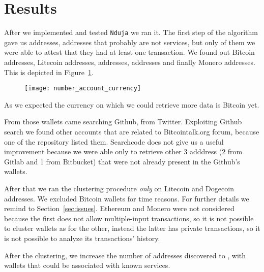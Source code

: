 \newcommand{\accountGitlab}{2}

\newcommand{\accountBitbucket}{1}





\section{Results} \label{results}
After we implemented and tested \texttt{Nduja} we ran it. The first step of the
algorithm gave us \startingNumberAllWallets{} addresses,
\startingNumberWalletsNotService{} addresses that probably are not services,
but only \startingNumberWalletsAtLeastOneTransaction{} of them we were able to
attest that they had at least one transaction. We found out \startingBTC{}
Bitcoin addresses, \startingLTC{} Litecoin addresses, \startingDOGE{}
addresses, \startingETH{} addresses and finally \startingXMR{} Monero
addresses. This is depicted in Figure~\ref{fig:numberaccountcurrency}.
\begin{figure}
\centering
\texttt{[image: number\_account\_currency]}
\label{fig:numberaccountcurrency}
\end{figure}

As we expected the currency on which we could retrieve more data is Bitcoin
yet. 

From those wallets \accountGithub{} came searching Github, \accountTwitter{}
from Twitter. Exploiting Github search we found other \accountBitcointalk{}
accounts that are related to Bitcointalk.org forum, because one of the
repository listed them. Searchcode does not give us a useful improvement
because we were able only to retrieve other 3 adddress (\accountGitlab{} from
Gitlab and \accountBitbucket{} from Bitbucket) that were not already present in
the Github's wallets. 

After that we ran the clustering procedure \emph{only} on Litecoin and Dogecoin
addresses. We excluded Bitcoin wallets for time reasons. For further details we
remind to Section~\ref{sec:issues}. Ethereum and Monero were not considered
because the first does not allow multiple-input transactions, so it is not
possible to cluster wallets as for the other, instead the latter has private
transactions, so it is not possible to analyze its transactions' history. 

After the clustering, we increase the number of addresses discovered to
\clusteringNumberAllWallets{}, with \clusteringNumberWalletsNotService{}
wallets that could be associated with known services.

